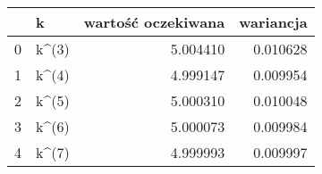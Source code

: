 \begin{tabular}{llrr}
\toprule
{} &      k &  wartość oczekiwana &  wariancja \\
\midrule
0 &  k\textasciicircum (3) &            5.004410 &   0.010628 \\
1 &  k\textasciicircum (4) &            4.999147 &   0.009954 \\
2 &  k\textasciicircum (5) &            5.000310 &   0.010048 \\
3 &  k\textasciicircum (6) &            5.000073 &   0.009984 \\
4 &  k\textasciicircum (7) &            4.999993 &   0.009997 \\
\bottomrule
\end{tabular}
